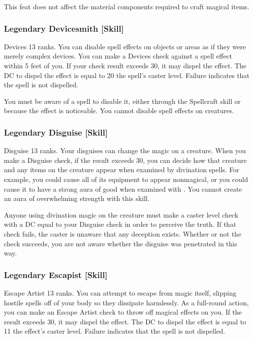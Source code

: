 This feat does not affect the material components required to craft magical items.

\subsubsection{Legendary Devicesmith [Skill]}
\featpre Devices 13 ranks.
\featben You can disable spell effects on objects or areas as if they were merely complex devices. You can make a Devices check against a spell effect within 5 feet of you. If your check result exceeds 30, it may dispel the effect. The DC to dispel the effect is equal to 20 \add the spell's caster level. Failure indicates that the spell is not dispelled. 

You must be aware of a spell to disable it, either through the Spellcraft skill or because the effect is noticeable. You cannot disable spell effects on creatures.

\subsubsection{Legendary Disguise [Skill]}
\featpre Disguise 13 ranks.
\featben Your disguises can change the magic on a creature. When you make a Disguise check, if the result exceeds 30, you can decide how that creature and any items on the creature appear when examined by divination spells. For example, you could cause all of its equipment to appear nonmagical, or you could cause it to have a strong aura of good when examined with . You cannot create an aura of overwhelming strength with this skill.

Anyone using divination magic on the creature must make a caster level check with a DC equal to your Disguise check in order to perceive the truth. If that check fails, the caster is unaware that any deception exists. Whether or not the check succeeds, you are not aware whether the disguise was penetrated in this way.

\subsubsection{Legendary Escapist [Skill]}
\featpre Escape Artist 13 ranks.
\featben You can attempt to escape from magic itself, slipping hostile spells off of your body so they dissipate harmlessly. As a full-round action, you can make an Escape Artist check to throw off magical effects on you. If the result exceeds 30, it may dispel the effect. The DC to dispel the effect is equal to 11 \add the effect's caster level. Failure indicates that the spell is not dispelled.

